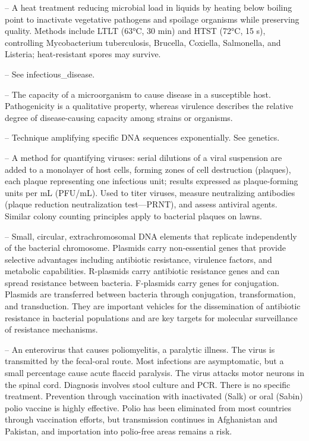 -- A heat treatment reducing microbial load in liquids by heating below boiling point to inactivate vegetative pathogens and spoilage organisms while preserving quality. Methods include LTLT (63°C, 30 min) and HTST (72°C, 15 s), controlling Mycobacterium tuberculosis, Brucella, Coxiella, Salmonella, and Listeria; heat-resistant spores may survive.

-- See infectious\_disease.

-- The capacity of a microorganism to cause disease in a susceptible host. Pathogenicity is a qualitative property, whereas virulence describes the relative degree of disease-causing capacity among strains or organisms.

-- Technique amplifying specific DNA sequences exponentially. See genetics.

-- A method for quantifying viruses: serial dilutions of a viral suspension are added to a monolayer of host cells, forming zones of cell destruction (plaques), each plaque representing one infectious unit; results expressed as plaque-forming units per mL (PFU/mL). Used to titer viruses, measure neutralizing antibodies (plaque reduction neutralization test—PRNT), and assess antiviral agents. Similar colony counting principles apply to bacterial plaques on lawns.

-- Small, circular, extrachromosomal DNA elements that replicate independently of the bacterial chromosome. Plasmids carry non-essential genes that provide selective advantages including antibiotic resistance, virulence factors, and metabolic capabilities. R-plasmids carry antibiotic resistance genes and can spread resistance between bacteria. F-plasmids carry genes for conjugation. Plasmids are transferred between bacteria through conjugation, transformation, and transduction. They are important vehicles for the dissemination of antibiotic resistance in bacterial populations and are key targets for molecular surveillance of resistance mechanisms.

-- An enterovirus that causes poliomyelitis, a paralytic illness. The virus is transmitted by the fecal-oral route. Most infections are asymptomatic, but a small percentage cause acute flaccid paralysis. The virus attacks motor neurons in the spinal cord. Diagnosis involves stool culture and PCR. There is no specific treatment. Prevention through vaccination with inactivated (Salk) or oral (Sabin) polio vaccine is highly effective. Polio has been eliminated from most countries through vaccination efforts, but transmission continues in Afghanistan and Pakistan, and importation into polio-free areas remains a risk.

